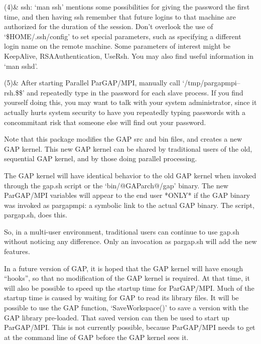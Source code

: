      (4)& ssh:  `man ssh' mentions some possibilities for giving the password
         the first time, and then having ssh remember that future logins
         to that machine are authorized for the duration of the session.
         Don't overlook the use of `\$HOME/.ssh/config' to set special
         parameters, such as specifying a different login name on the
         remote machine.  Some parameters of interest might be KeepAlive,
         RSAAuthentication, UseRsh.  You may also find useful information
         in `man sshd'.

     (5)& After starting Parallel ParGAP/MPI, manually call
           `/tmp/pargapmpi--rsh.\$\$'
         and repeatedly type in the password for each slave process.
         If you find yourself doing this, you may want to talk with
         your system administrator, since it actually hurts system
         security to have you repeatedly typing passwords with a
         concommitant risk that someone else will find out your password.
\enditems


Note that this package modifies the GAP src and bin files, and creates
a new GAP kernel.  This new GAP kernel can be shared by traditional users
of the old, sequential GAP kernel, and by those doing parallel processing.

The GAP kernel will have identical behavior to the
old GAP kernel when invoked through the gap.sh script or the
`bin/@GAParch@/gap' binary.  The new ParGAP/MPI variables will appear to the
end user *ONLY* if the GAP binary was invoked as pargapmpi:  a symbolic
link to the actual GAP binary.  The script, pargap.sh, does this.

So, in a multi-user environment, traditional users can continue to use
gap.sh without noticing any difference.  Only an invocation as pargap.sh
will add the new features.

In a future version of GAP, it is hoped
that the GAP kernel will have enough ``hooks'', so that no
modification of the GAP kernel is required.  At that time, it will
also be possible to speed up the startup time for ParGAP/MPI.  Much of
the startup time is caused by waiting for GAP to read its library
files.  It will be possible to use the GAP function, `SaveWorkspace()'
to save a version with the GAP library pre-loaded.  That saved version
can then be used to start up ParGAP/MPI.  This is not currently
possible, because ParGAP/MPI needs to get at the command line of GAP
before the GAP kernel sees it.

